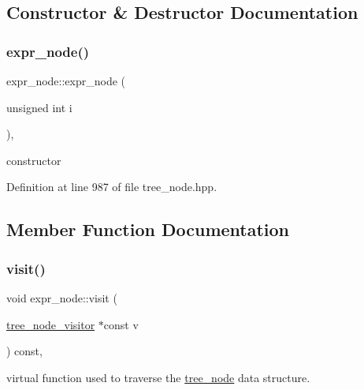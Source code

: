 \subsection{Constructor \& Destructor Documentation}
\mbox{\label{structexpr__node_aa4e209b55521aae1a91bfbddeb627350}} 
\subsubsection{\texorpdfstring{expr\+\_\+node()}{expr\_node()}}
{\footnotesize\ttfamily expr\+\_\+node\+::expr\+\_\+node (\begin{DoxyParamCaption}\item[{unsigned int}]{i }\end{DoxyParamCaption})\hspace{0.3cm}{\ttfamily [inline]}, {\ttfamily [explicit]}}



constructor 



Definition at line 987 of file tree\+\_\+node.\+hpp.



\subsection{Member Function Documentation}
\mbox{\label{structexpr__node_aac767878f13ca07371dde2c3938ef38a}} 
\subsubsection{\texorpdfstring{visit()}{visit()}}
{\footnotesize\ttfamily void expr\+\_\+node\+::visit (\begin{DoxyParamCaption}\item[{\hyperlink{classtree__node__visitor}{tree\+\_\+node\+\_\+visitor} $\ast$const}]{v }\end{DoxyParamCaption}) const\hspace{0.3cm}{\ttfamily [override]}, {\ttfamily [virtual]}}



virtual function used to traverse the \hyperlink{classtree__node}{tree\+\_\+node} data structure. 


